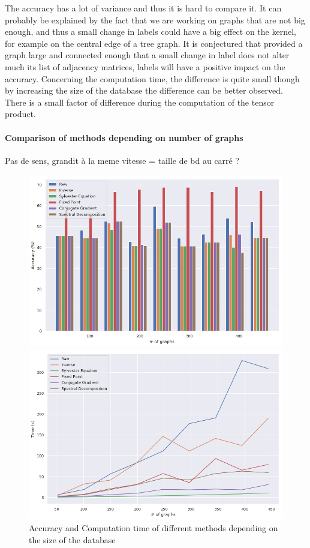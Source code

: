 \documentclass{article}
\theoremstyle{definition}
\begin{document}
The accuracy has a lot of variance and thus it is hard to compare it. It can probably be explained by the fact that we are working on graphs that are not big enough, and thus a small change in labels could have a big effect on the kernel, for example on the central edge of a tree graph. It is conjectured that provided a graph large and connected enough that a small change in label does not alter much its list of adjacency matrices, labels will have a positive impact on the accuracy. Concerning the computation time, the difference is quite small though by increasing the size of the database the difference can be better observed. There is a small factor of difference during the computation of the tensor product.
\paragraph{Comparison of methods depending on number of graphs}
Pas de sens, grandit à la meme vitesse = taille de bd au carré ?
\begin{figure}[!htb]
	\begin{multicols}{2}
		\includegraphics[width=\linewidth]{data/nb_graph/acc.png}\par
		\includegraphics[width=\linewidth]{data/nb_graph/time.png}\par
	\end{multicols}
	\caption{Accuracy and Computation time of different methods depending on the size of the database}
\end{figure}
\end{document}
